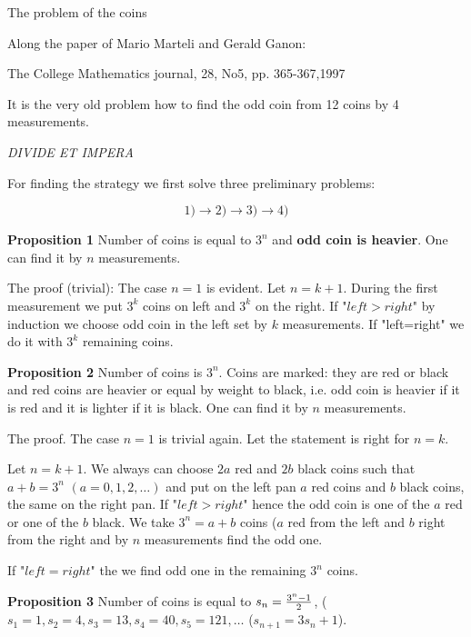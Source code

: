 
\centerline {The problem of the coins}

\bigskip
  \centerline {Along the paper of  Mario Marteli and Gerald Ganon:}


  \centerline {The College Mathematics journal, 28, No5, pp. 365-367,1997}



 It is the very old problem how to find the odd coin from 12 coins
 by 4 measurements.

    \bigskip

   \centerline {\it DIVIDE ET IMPERA}

      $$ $$
  For finding the strategy we first solve three preliminary
  problems:

       $$
       1)\rightarrow 2)\rightarrow 3)\rightarrow 4)
                    $$

  {\bf Proposition 1}
   Number of coins is equal to $3^n$ and {\bf odd coin is heavier}.
    One can find it by $n$ measurements.


    The proof (trivial): The case $n=1$ is evident. Let $n=k+1$. During the
    first measurement we put $3^k$ coins on left and $3^k$ on the
    right. If "$left > right$" by induction we choose odd coin in
    the left set by $k$ measurements. If "left=right" we do it
    with $3^k$ remaining coins.

       \bigskip

     {\bf Proposition 2}
      Number of coins is $3^n$. Coins are marked: they are red or black and
     red coins are heavier or equal by weight to black,
     i.e. odd coin is heavier if it is red and it is  lighter if it
     is black.
     One can find it by $n$ measurements.

     The proof. The case $n=1$ is trivial again.
   Let the statement is right for $n=k$.

      Let $n=k+1$.
     We always can choose $2a$ red and
    $2b$ black coins such that $a+b=3^n$ $(a=0,1,2,\dots)$ and put on the left
    pan $a$ red coins and $b$ black coins, the same on the
     right pan. If "$left> right$" hence the odd
  coin is one of the $a$ red or one of the $b$ black.
  We take $3^n=a+b$ coins ($a$ red from the left and $b$ right
  from the right and by $n$ measurements find the odd one.

    If "$left=right$" the we find odd one in the remaining $3^n$
    coins.

 \bigskip

   {\bf Proposition 3}
       Number of coins is equal to $s_n={3^n-1\over 2}$,
    ($s_1=1,s_2=4,s_3=13,s_4=40,s_5=121,\dots$ ($s_{n+1}=3s_n+1$).

